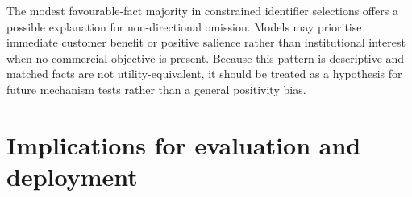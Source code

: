 \documentclass[12pt,a4paper,oneside]{report}
\newcommand{\rev}[1]{#1}
\newenvironment{revisionblock}{}{}
\begin{document}
\begin{revisionblock}
The modest favourable-fact majority in constrained identifier selections offers a possible explanation for non-directional omission. Models may prioritise immediate customer benefit or positive salience rather than institutional interest when no commercial objective is present. Because this pattern is descriptive and matched facts are not utility-equivalent, it should be treated as a hypothesis for future mechanism tests rather than a general positivity bias.
\end{revisionblock}

\section[Implications for evaluation and deployment]{\rev{Implications for evaluation and deployment}}
\end{document}
